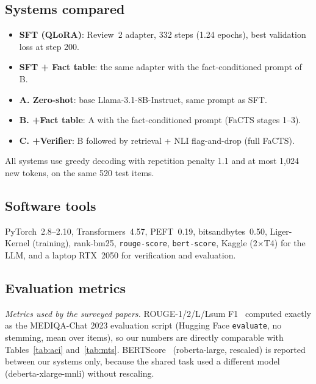 \documentclass[conference]{IEEEtran}
\begin{document}


\subsection{Systems compared}
\begin{itemize}
\item \textbf{SFT (QLoRA)}: Review~2 adapter, 332 steps (1.24 epochs), best validation loss at step 200.
\item \textbf{SFT + Fact table}: the same adapter with the fact-conditioned prompt of B.
\item \textbf{A. Zero-shot}: base Llama-3.1-8B-Instruct, same prompt as SFT.
\item \textbf{B. +Fact table}: A with the fact-conditioned prompt (FaCTS stages 1--3).
\item \textbf{C. +Verifier}: B followed by retrieval + NLI flag-and-drop (full FaCTS).
\end{itemize}
All systems use greedy decoding with repetition penalty 1.1 and at most 1,024 new tokens, on the same 520 test items.

\subsection{Software tools}
PyTorch~2.8--2.10, Transformers~4.57, PEFT~0.19, bitsandbytes~0.50, Liger-Kernel (training), rank-bm25,
\texttt{rouge-score}, \texttt{bert-score}, Kaggle (2$\times$T4) for the LLM, and a laptop RTX~2050 for
verification and evaluation.

\subsection{Evaluation metrics}
\emph{Metrics used by the surveyed papers.} ROUGE-1/2/L/Lsum F1~\cite{lin2004rouge} computed exactly as the
MEDIQA-Chat 2023 evaluation script (Hugging Face \texttt{evaluate}, no stemming, mean over items), so our
numbers are directly comparable with Tables~\ref{tab:aci} and~\ref{tab:mts}. BERTScore~\cite{zhang2020bertscore}
(roberta-large, rescaled) is reported between our systems only, because the shared task used a different
model (deberta-xlarge-mnli) without rescaling.
\end{document}
